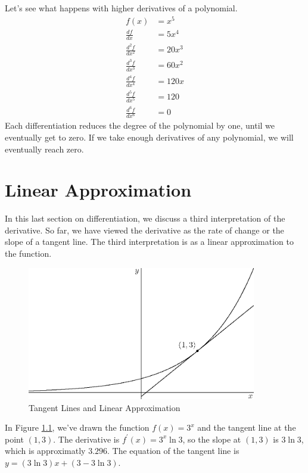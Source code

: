\documentclass[fleqn]{report}
\begin{document}
\begin{example}
Let's see what happens with higher derivatives of a
polynomial. 
\begin{align*}
f(x) & = x^5 \\
\frac{df}{dx} & = 5x^4 \\
\frac{d^2f}{dx^2} & = 20x^3 \\
\frac{d^3f}{dx^3} & = 60x^2 \\
\frac{d^4f}{dx^4} & = 120x \\
\frac{d^5f}{dx^5} & = 120 \\
\frac{d^6f}{dx^6} & = 0 
\end{align*}
Each differentiation reduces the degree of the polynomial by
one, until we eventually get to zero. If we take enough
derivatives of any polynomial, we will eventually reach zero.
\end{example}

\chapter{Linear Approximation}
\label{Linear Approximation}

In this last section on differentiation, we discuss a third
interpretation of the derivative. So far, we have viewed the 
derivative as the rate of change or the slope of a tangent line.
The third interpretation is as a linear approximation to the
function. 

\begin{figure}[ht]
\centering
\includegraphics[width=10cm]{figure51.eps}
\caption{Tangent Lines and Linear Approximation}
\label{Tangent Lines and Linear Approximation}
\end{figure}

In Figure \ref{Tangent Lines and Linear Approximation}, we've
drawn the function $f(x) = 3^x$ and the tangent line at the
point $(1,3)$. The derivative is $f^\prime(x) = 3^x \ln 3$, so
the slope at $(1,3)$ is $3 \ln 3$, which is approximatly
$3.296$. The equation of the tangent line is $y = (3 \ln 3) x
+ (3 - 3 \ln 3)$. 
\clearpage
\end{document}
